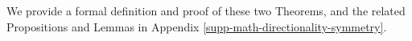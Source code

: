 %

%
We provide a formal definition and proof of these two Theorems, and the related Propositions and Lemmas in Appendix \ref{supp-math-directionality-symmetry}.
%
%
%


